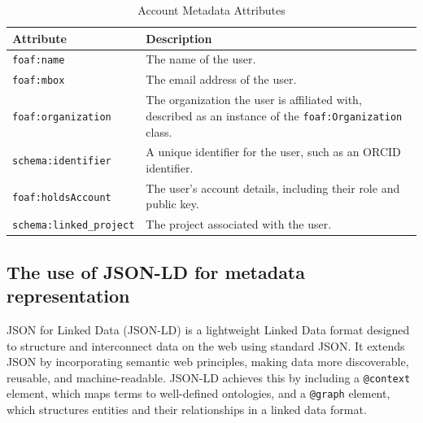 \documentclass{article}
\begin{document}
\begin{table}[h]
      \centering
      \renewcommand{\arraystretch}{1.2}
      \begin{tabularx}{\textwidth}{|l|X|}
            \hline
            \textbf{Attribute}              & \textbf{Description}                                                                                            \\ \hline
            \texttt{foaf:name}              & The name of the user.                                                                                           \\ \hline
            \texttt{foaf:mbox}              & The email address of the user.                                                                                  \\ \hline
            \texttt{foaf:organization}      & The organization the user is affiliated with, described as an instance of the \texttt{foaf:Organization} class. \\ \hline
            \texttt{schema:identifier}      & A unique identifier for the user, such as an ORCID identifier.                                                  \\ \hline
            \texttt{foaf:holdsAccount}      & The user's account details, including their role and public key.                                                \\ \hline
            \texttt{schema:linked\_project} & The project associated with the user.                                                                           \\ \hline
      \end{tabularx}
      \caption{Account Metadata Attributes}
      \label{tab:user_metadata}
\end{table}


\subsection{The use of JSON-LD for metadata representation}

JSON for Linked Data (JSON-LD) is a lightweight Linked Data format designed to structure and interconnect data on the web using standard JSON. It extends JSON by incorporating semantic web principles, making data more discoverable, reusable, and machine-readable. JSON-LD achieves this by including a \texttt{@context} element, which maps terms to well-defined ontologies, and a \texttt{@graph} element, which structures entities and their relationships in a linked data format.
\end{document}
